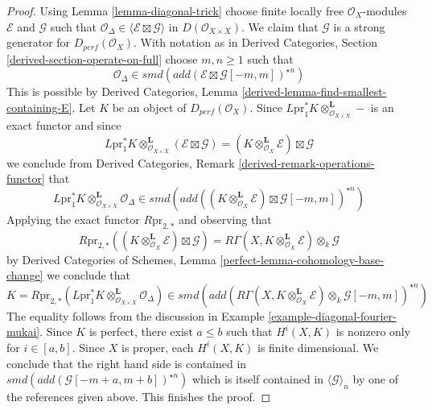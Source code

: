 \documentclass{stacks-project}
\theoremstyle{plain}
\theoremstyle{definition}
\theoremstyle{remark}
\numberwithin{equation}{subsection}
\begin{document}
\begin{proof}
Using Lemma \ref{lemma-diagonal-trick} choose finite locally free
$\mathcal{O}_X$-modules $\mathcal{E}$ and $\mathcal{G}$ such that
$\mathcal{O}_\Delta \in \langle \mathcal{E} \boxtimes \mathcal{G} \rangle$
in $D(\mathcal{O}_{X \times X})$. We claim that $\mathcal{G}$
is a strong generator for $D_{perf}(\mathcal{O}_X)$. With notation as in
Derived Categories, Section \ref{derived-section-operate-on-full}
choose $m, n \geq 1$ such that
$$
\mathcal{O}_\Delta \in
smd(add(\mathcal{E} \boxtimes \mathcal{G}[-m, m])^{\star n})
$$
This is possible by Derived Categories, Lemma
\ref{derived-lemma-find-smallest-containing-E}.
Let $K$ be an object of $D_{perf}(\mathcal{O}_X)$. Since
$L\text{pr}_1^*K \otimes_{\mathcal{O}_{X \times X}}^\mathbf{L} -$
is an exact functor and since
$$
L\text{pr}_1^*K \otimes_{\mathcal{O}_{X \times X}}^\mathbf{L}
(\mathcal{E} \boxtimes \mathcal{G}) =
(K \otimes_{\mathcal{O}_X}^\mathbf{L} \mathcal{E}) \boxtimes \mathcal{G}
$$
we conclude from
Derived Categories, Remark \ref{derived-remark-operations-functor} that
$$
L\text{pr}_1^*K
\otimes_{\mathcal{O}_{X \times X}}^\mathbf{L}
\mathcal{O}_\Delta
\in
smd(add(
(K \otimes_{\mathcal{O}_X}^\mathbf{L} \mathcal{E})
\boxtimes \mathcal{G}[-m, m])^{\star n})
$$
Applying the exact functor $R\text{pr}_{2, *}$ and observing that
$$
R\text{pr}_{2, *}
\left((K \otimes_{\mathcal{O}_X}^\mathbf{L} \mathcal{E}) \boxtimes
\mathcal{G}\right) =
R\Gamma(X, K \otimes_{\mathcal{O}_X}^\mathbf{L} \mathcal{E})
\otimes_k \mathcal{G}
$$
by Derived Categories of Schemes, Lemma
\ref{perfect-lemma-cohomology-base-change} we conclude that
$$
K = R\text{pr}_{2, *}(L\text{pr}_1^*K
\otimes_{\mathcal{O}_{X \times X}}^\mathbf{L} \mathcal{O}_\Delta)
\in
smd(add(R\Gamma(X, K \otimes_{\mathcal{O}_X}^\mathbf{L} \mathcal{E})
\otimes_k \mathcal{G}[-m, m])^{\star n})
$$
The equality follows from the discussion in
Example \ref{example-diagonal-fourier-mukai}.
Since $K$ is perfect, there exist $a \leq b$ such that
$H^i(X, K)$ is nonzero only for $i \in [a, b]$. Since $X$ is proper,
each $H^i(X, K)$ is finite dimensional. We conclude that
the right hand side is contained in
$smd(add(\mathcal{G}[-m + a, m + b])^{\star n})$ which is
itself contained in $\langle \mathcal{G} \rangle_n$ by one of the
references given above. This finishes the proof.
\end{proof}
\end{document}

